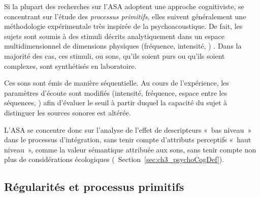 Si la plupart des recherches sur l'ASA adoptent une approche cognitiviste, se concentrant sur l'étude des \emph{processus primitifs}, elles suivent généralement une méthodologie expérimentale très inspirée de la psychoacoustique. De fait, les sujets sont soumis à des stimuli décrits analytiquement dans un espace multidimensionnel de dimensions physiques (fréquence, intensité, \etc) \citep{dubois2006cognitive}. Dans la majorité des cas, ces stimuli, ou sons, qu'ils soient purs ou qu'ils soient complexes, sont synthétisés en laboratoire.

Ces sons sont émis de manière séquentielle. Au cours de l'expérience, les paramètres d'écoute sont modifiés (intensité, fréquence, espace entre les séquences, \etc) afin d'évaluer le seuil à partir duquel la capacité du sujet à distinguer les sources sonores est altérée.

L'ASA se concentre donc sur l'analyse de l'effet de descripteurs «~bas niveau~» dans le processus d'intégration, sans tenir compte d'attributs perceptifs «~haut niveau~», comme la valeur sémantique attribuée aux sons, sans tenir compte non plus de considérations écologiques (\cf~Section~\ref{sec:ch3_psychoCogDef}). 

\subsection{Régularités et processus primitifs}
\label{sec:ch3_regularitesEtProcessusPrimitifs}


